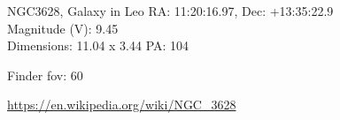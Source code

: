 \begin{block}{NGC3628, Galaxy in Leo}
    RA: 11:20:16.97, Dec: +13:35:22.9 \\ 
    Magnitude (V): 9.45 \\ 
    Dimensions: 11.04 x 3.44 PA: 104 

    Finder fov: 60 

    \url{https://en.wikipedia.org/wiki/NGC_3628} 
\end{block}